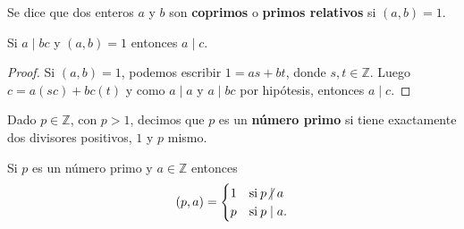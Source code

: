 \begin{definition}
Se dice que dos enteros $a$ y $b$ son \textbf{coprimos} o \textbf{primos relativos} si $(a,b)=1$.
\end{definition}

\begin{theorem}
Si $a \mid bc$ y $(a,b)=1$ entonces $a \mid c$.
\end{theorem}
\begin{proof}
Si $(a,b)=1$, podemos escribir $1=a s+b t$, donde $s,t\in \mathbb{Z}$. Luego $c=a(s c)+b c(t)$ y como $a \mid a$ y $a \mid bc$ por hipótesis, entonces $a \mid c$.
\end{proof}

\begin{definition}
Dado $p\in \mathbb{Z}$, con $p>1$, decimos que $p$ es un \textbf{número primo} si tiene exactamente dos divisores positivos, $1$ y $p$ mismo.
\end{definition}

%
%
%

\begin{corollary}
Si $p$ es un número primo y $a\in \mathbb{Z}$ entonces 
\begin{equation*}
	(p,a) =
		\begin{cases}
			1 & \text{si} \: p \centernot\mid a \\ %
			p & \text{si} \: p \mid a.
		\end{cases}
\end{equation*}
\end{corollary}

